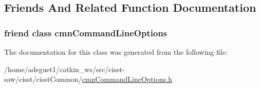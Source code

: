 \subsection{Friends And Related Function Documentation}
\hypertarget{classcmn_command_line_options_1_1_option_one_value_base_a18923f23ed3914806f1edf878a64b422}{
\subsubsection[{cmn\-Command\-Line\-Options}]{\setlength{\rightskip}{0pt plus 5cm}friend class {\bf cmn\-Command\-Line\-Options}\hspace{0.3cm}{\ttfamily [friend]}}}\label{classcmn_command_line_options_1_1_option_one_value_base_a18923f23ed3914806f1edf878a64b422}


The documentation for this class was generated from the following file\-:\begin{DoxyCompactItemize}
\item 
/home/adeguet1/catkin\-\_\-ws/src/cisst-\/saw/cisst/cisst\-Common/\hyperlink{cmn_command_line_options_8h}{cmn\-Command\-Line\-Options.\-h}\end{DoxyCompactItemize}
